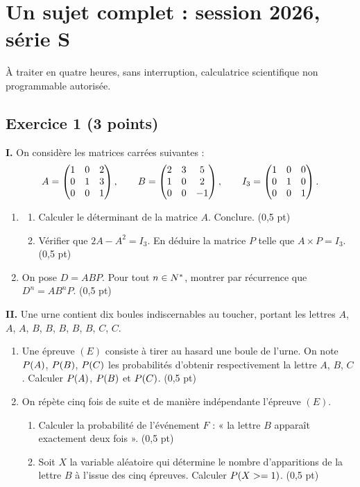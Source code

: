 \section*{Un sujet complet : session 2026, série S}

À traiter en quatre heures, sans interruption, calculatrice scientifique non
programmable autorisée.

\subsection*{Exercice 1 \textnormal{(3 points)}}

\textbf{I.} On considère les matrices carrées suivantes :
\[
  A = \begin{pmatrix} 1 & 0 & 2 \\ 0 & 1 & 3 \\ 0 & 0 & 1 \end{pmatrix}, \qquad
  B = \begin{pmatrix} 2 & 3 & 5 \\ 1 & 0 & 2 \\ 0 & 0 & -1 \end{pmatrix}, \qquad
  I_{3} = \begin{pmatrix} 1 & 0 & 0 \\ 0 & 1 & 0 \\ 0 & 0 & 1 \end{pmatrix}.
\]
\begin{enumerate}[label=\textbf{\arabic*.}, leftmargin=*, itemsep=0.2em]
  \item \begin{enumerate}[label=\textbf{\alph*)}, leftmargin=1.4em]
          \item Calculer le déterminant de la matrice $A$. Conclure.
                \hfill\textup{(0,5 pt)}
          \item Vérifier que $2A-A^{2} = I_{3}$. En déduire la matrice $P$
                telle que $A \times P = I_{3}$. \hfill\textup{(0,5 pt)}
        \end{enumerate}
  \item On pose $D = ABP$. Pour tout $n \in N^{*}$, montrer par récurrence
        que $D^{n} = AB^{n}P$. \hfill\textup{(0,5 pt)}
\end{enumerate}

\textbf{II.} Une urne contient dix boules indiscernables au toucher, portant
les lettres $A$, $A$, $A$, $B$, $B$, $B$, $B$, $B$, $C$, $C$.
\begin{enumerate}[label=\textbf{\arabic*.}, leftmargin=*, itemsep=0.2em]
  \item Une épreuve $(E)$ consiste à tirer au hasard une boule de l'urne. On
        note $P\!\left(A\right)$, $P\!\left(B\right)$, $P\!\left(C\right)$ les probabilités d'obtenir
        respectivement la lettre $A$, $B$, $C$. Calculer $P\!\left(A\right)$,
        $P\!\left(B\right)$ et $P\!\left(C\right)$. \hfill\textup{(0,5 pt)}
  \item On répète cinq fois de suite et de manière indépendante l'épreuve
        $(E)$.
        \begin{enumerate}[label=\textbf{\alph*)}, leftmargin=1.4em]
          \item Calculer la probabilité de l'événement $F$ : « la lettre $B$
                apparaît exactement deux fois ». \hfill\textup{(0,5 pt)}
          \item Soit $X$ la variable aléatoire qui détermine le nombre
                d'apparitions de la lettre $B$ à l'issue des cinq épreuves.
                Calculer $P\!\left(X >= 1\right)$. \hfill\textup{(0,5 pt)}
        \end{enumerate}
\end{enumerate}

